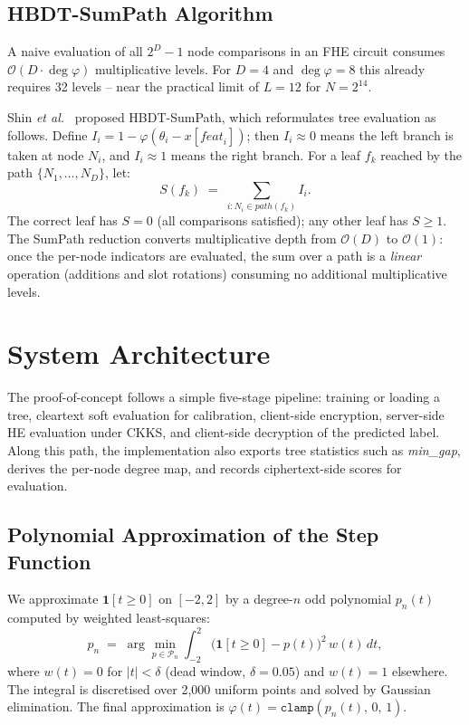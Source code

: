 \documentclass[runningheads]{llncs}
\begin{document}
\subsection{HBDT-SumPath Algorithm}
\label{sec:sumpath}

A naive evaluation of all $2^D - 1$ node comparisons in an FHE circuit
consumes $\mathcal{O}(D \cdot \deg \varphi)$ multiplicative levels.  For
$D = 4$ and $\deg \varphi = 8$ this already requires 32 levels -- near the
practical limit of $L = 12$ for $N = 2^{14}$.

Shin \emph{et al.}~\cite{shin2022privacy} proposed HBDT-SumPath, which
reformulates tree evaluation as follows.  Define
$I_i = 1 - \varphi(\theta_i - x[\mathit{feat}_i])$; then $I_i \approx 0$
means the left branch is taken at node $N_i$, and $I_i \approx 1$ means the
right branch.  For a leaf $f_k$ reached by the path
$\{N_1, \ldots, N_D\}$, let:
\begin{equation}
  S(f_k) \;=\; \sum_{i : N_i \in \mathit{path}(f_k)} I_i.
  \label{eq:sumpath}
\end{equation}
The correct leaf has $S = 0$ (all comparisons satisfied); any other leaf has
$S \geq 1$.  The SumPath reduction converts multiplicative depth from
$\mathcal{O}(D)$ to $\mathcal{O}(1)$: once the per-node indicators are
evaluated, the sum over a path is a \emph{linear} operation (additions and
slot rotations) consuming no additional multiplicative levels.

\section{System Architecture}
\label{sec:system}

The proof-of-concept follows a simple five-stage pipeline: training or
loading a tree, cleartext soft evaluation for calibration, client-side
encryption, server-side HE evaluation under CKKS, and client-side
decryption of the predicted label.  Along this path, the implementation
also exports tree statistics such as \textit{min\_gap}, derives the
per-node degree map, and records ciphertext-side scores for evaluation.

\subsection{Polynomial Approximation of the Step Function}
\label{sec:softapprox}

We approximate $\mathbf{1}[t \geq 0]$ on $[-2, 2]$ by a degree-$n$ odd
polynomial $p_n(t)$ computed by weighted least-squares:
\begin{equation}
  p_n \;=\; \arg\min_{p \in \mathcal{P}_n}
    \int_{-2}^{2} \bigl(\mathbf{1}[t \geq 0] - p(t)\bigr)^2 \, w(t)\,dt,
  \label{eq:wls}
\end{equation}
where $w(t) = 0$ for $|t| < \delta$ (dead window, $\delta = 0.05$) and
$w(t) = 1$ elsewhere.  The integral is discretised over 2{,}000 uniform
points and solved by Gaussian elimination.  The final approximation is
$\varphi(t) = \mathtt{clamp}(p_n(t),\, 0,\, 1)$.
\end{document}
